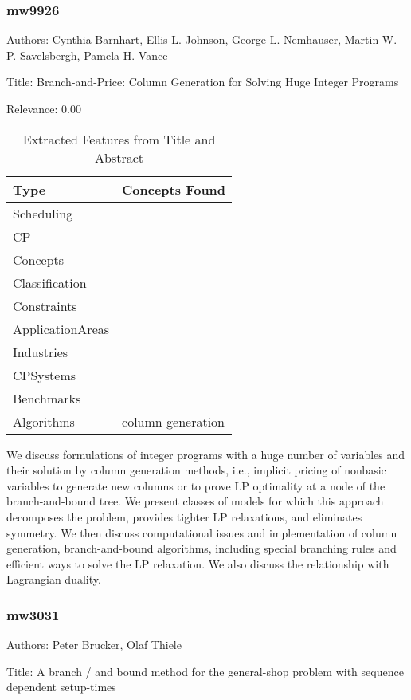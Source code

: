 \subsubsection{mw9926}
\label{mw:mw9926}

Authors: Cynthia Barnhart, Ellis L. Johnson, George L. Nemhauser, Martin W. P. Savelsbergh, Pamela H. Vance

Title: Branch-and-Price: Column Generation for Solving Huge Integer Programs

Relevance:  0.00

{\scriptsize
\begin{longtable}{p{2cm}p{20cm}}
\caption{Extracted Features from Title and Abstract}\\ \toprule
Type & Concepts Found\\ \midrule
\endhead
\bottomrule
\endfoot
Scheduling & \\ 
CP & \\ 
Concepts & \\ 
Classification & \\ 
Constraints & \\ 
ApplicationAreas & \\ 
Industries & \\ 
CPSystems & \\ 
Benchmarks & \\ 
Algorithms & column generation\\ 
\end{longtable}
}

  We discuss formulations of integer programs with a huge number of variables and their solution by column generation methods, i.e., implicit pricing of nonbasic variables to generate new columns or to prove LP optimality at a node of the branch-and-bound tree. We present classes of models for which this approach decomposes the problem, provides tighter LP relaxations, and eliminates symmetry. We then discuss computational issues and implementation of column generation, branch-and-bound algorithms, including special branching rules and efficient ways to solve the LP relaxation. We also discuss the relationship with Lagrangian duality.  

\subsubsection{mw3031}
\label{mw:mw3031}

Authors: Peter Brucker, Olaf Thiele

Title: A branch / and  bound method for the general-shop problem with sequence dependent setup-times

